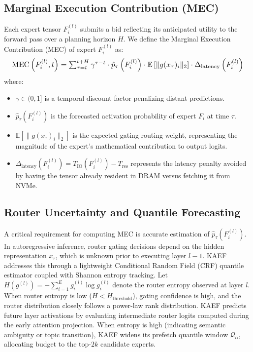 \subsection{Marginal Execution Contribution (MEC)}
Each expert tensor $F_i^{(l)}$ submits a bid reflecting its anticipated utility to the forward pass over a planning horizon $H$. We define the Marginal Execution Contribution (MEC) of expert $F_i^{(l)}$ as:
\begin{equation}
\resizebox{0.98\columnwidth}{!}{$
    \text{MEC}\left(F_i^{(l)}, t\right) = \sum_{\tau=t}^{t+H} \gamma^{\tau - t} \cdot \hat{p}_\tau\left(F_i^{(l)}\right) \cdot \mathbb{E}\left[ \| g(x_\tau)_i \|_2 \right] \cdot \Delta_{\text{latency}}\left(F_i^{(l)}\right)
$}
    \label{eq:mec}
\end{equation}
where:
\begin{itemize}
    \item $\gamma \in (0, 1]$ is a temporal discount factor penalizing distant predictions.
    \item $\hat{p}_\tau(F_i^{(l)})$ is the forecasted activation probability of expert $F_i$ at time $\tau$.
    \item $\mathbb{E}[\|g(x_\tau)_i\|_2]$ is the expected gating routing weight, representing the magnitude of the expert's mathematical contribution to output logits.
    \item $\Delta_{\text{latency}}(F_i^{(l)}) = T_{\text{IO}}(F_i^{(l)}) - T_{\text{res}}$ represents the latency penalty avoided by having the tensor already resident in DRAM versus fetching it from NVMe.
\end{itemize}

\subsection{Router Uncertainty and Quantile Forecasting}
A critical requirement for computing MEC is accurate estimation of $\hat{p}_\tau(F_i^{(l)})$. In autoregressive inference, router gating decisions depend on the hidden representation $x_\tau$, which is unknown prior to executing layer $l-1$.
KAEF addresses this through a lightweight Conditional Random Field (CRF) quantile estimator coupled with Shannon entropy tracking. 
Let $H(g^{(l)}) = -\sum_{i=1}^E g_i^{(l)} \log g_i^{(l)}$ denote the router entropy observed at layer $l$. 
When router entropy is low ($H < H_{\text{threshold}}$), gating confidence is high, and the router distribution closely follows a power-law rank distribution. KAEF predicts future layer activations by evaluating intermediate router logits computed during the early attention projection. 
When entropy is high (indicating semantic ambiguity or topic transition), KAEF widens its prefetch quantile window $\mathcal{Q}_\alpha$, allocating budget to the top-$2k$ candidate experts.

